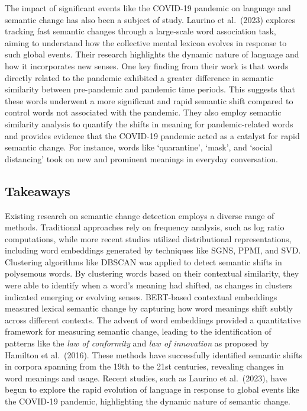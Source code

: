 The impact of significant events like the COVID-19 pandemic on language and semantic change has also been a subject of study.
Laurino et al.\ (2023) explores tracking fast semantic changes through a large-scale word association task, aiming to understand how the collective mental lexicon evolves in response to such global events.
Their research highlights the dynamic nature of language and how it incorporates new senses.
One key finding from their work is that words directly related to the pandemic exhibited a greater difference in semantic similarity between pre-pandemic and pandemic time periods.
This suggests that these words underwent a more significant and rapid semantic shift compared to control words not associated with the pandemic.
They also employ semantic similarity analysis to quantify the shifts in meaning for pandemic-related words and provides evidence that the COVID-19 pandemic acted as a catalyst for rapid semantic change.
For instance, words like `quarantine', `mask', and `social distancing' took on new and prominent meanings in everyday conversation.

\subsection{Takeaways}\label{subsec:semantic-takeaways}
Existing research on semantic change detection employs a diverse range of methods.
Traditional approaches rely on frequency analysis, such as log ratio computations\cite{gulordava-baroni-2011-distributional},
while more recent studies utilized distributional representations\cite{kim-etal-2014-temporal, kulkarni2014statisticallysignificantdetectionlinguistic, hamilton-etal-2016-cultural},
including word embeddings generated by techniques like SGNS, PPMI, and SVD\cite{hamilton-etal-2016-diachronic}.
Clustering algorithms like DBSCAN\cite{10.1007/978-3-319-50496-4_18} was applied to detect semantic shifts in polysemous words.
By clustering words based on their contextual similarity, they were able to identify when a word’s meaning had shifted, as changes in clusters indicated emerging or evolving senses.
BERT-based contextual embeddings\cite{giulianelli-etal-2020-analysing} measured lexical semantic change by capturing how word meanings shift subtly across different contexts.
The advent of word embeddings provided a quantitative framework for measuring semantic change,
leading to the identification of patterns like the \emph{law of conformity} and \emph{law of innovation} as proposed by Hamilton et al.\ (2016).
These methods have successfully identified semantic shifts in corpora spanning from the 19th to the 21st centuries, revealing changes in word meanings and usage.
Recent studies, such as Laurino et al.\ (2023), have begun to explore the rapid evolution of language in response to global events like the COVID-19 pandemic,
highlighting the dynamic nature of semantic change.

